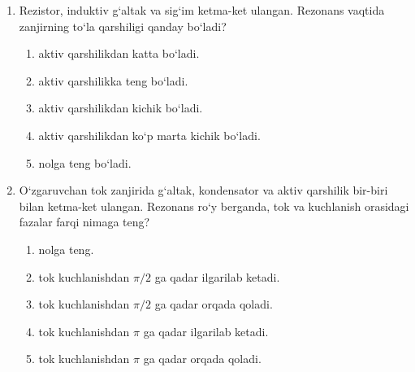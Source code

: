 \begin{enumerate}



\begin{enumerate}[label=\Alph*)]
\item 30.
\item 40.
\item 50.
\item 60.
\item 80.
\end{enumerate}

\item Rezistor, induktiv g‘altak va sig‘im ketma-ket ulangan. Rezonans vaqtida zanjirning to‘la qarshiligi qanday bo‘ladi?
\begin{enumerate}[label=\Alph*)]
\item aktiv qarshilikdan katta bo‘ladi.
\item aktiv qarshilikka teng bo‘ladi.
\item aktiv qarshilikdan kichik bo‘ladi.
\item aktiv qarshilikdan ko‘p marta kichik bo‘ladi.
\item nolga teng bo‘ladi.
\end{enumerate}

\item O‘zgaruvchan tok zanjirida g‘altak, kondensator va aktiv qarshilik bir-biri bilan ketma-ket ulangan. Rezonans ro‘y berganda, tok va kuchlanish orasidagi fazalar farqi nimaga teng?
\begin{enumerate}[label=\Alph*)]
\item nolga teng.
\item tok kuchlanishdan $\pi/2$ ga qadar ilgarilab ketadi.
\item tok kuchlanishdan $\pi/2$ ga qadar orqada qoladi.
\item tok kuchlanishdan $\pi$ ga qadar ilgarilab ketadi.
\item tok kuchlanishdan $\pi$ ga qadar orqada qoladi.
\end{enumerate}


\end{enumerate}
